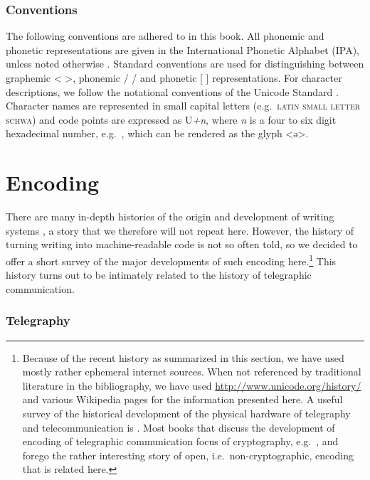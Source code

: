 \subsubsection*{Conventions}

The following conventions are adhered to in this book. All phonemic and phonetic
representations are given in the International Phonetic Alphabet (IPA), unless
noted otherwise \citep{IPA2015}. Standard conventions are used for
distinguishing between graphemic < >, phonemic / / and phonetic [ ]
representations. For character descriptions, we follow the notational
conventions of the Unicode Standard \citep{Unicode2018}. Character names are
represented in small capital letters (e.g.~\textsc{latin small letter schwa})
and code points are expressed as U\emph{+n}, where \emph{n} is a four to six
digit hexadecimal number, e.g.~, which can be rendered as the glyph <ə>.

\section{Encoding}
\label{encoding}

There are many in-depth histories of the origin and development of writing
systems \citep[e.g.~][]{Robinson1995,Powell2012}, a story that we therefore will
not repeat here. However, the history of turning writing into machine-readable
code is not so often told, so we decided to offer a short survey of the major
developments of such encoding here.\footnote{Because of the recent
history as summarized in this section, we have used mostly rather ephemeral
internet sources. When not referenced by traditional literature in the
bibliography, we have used \url{http://www.unicode.org/history/} and various
Wikipedia pages for the information presented here. A useful survey of the
historical development of the physical hardware of telegraphy and
telecommunication is \citet{Huurdeman2003}. Most books that discuss the
development of encoding of telegraphic communication focus of cryptography,
e.g.~\citet{Singh1999}, and forego the rather interesting story of open,
i.e.~non-cryptographic, encoding that is related here.} This history turns out
to be intimately related to the history of telegraphic communication.

\subsubsection*{Telegraphy}

